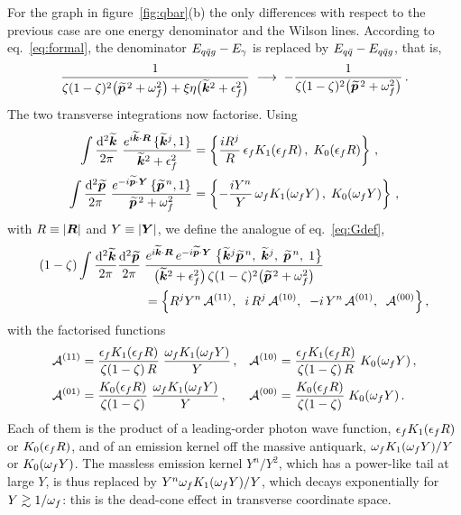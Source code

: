 For the graph in figure~\ref{fig:qbar}(b) the only differences with respect to the previous case are
one energy denominator and the Wilson lines. According to eq.~\eqref{eq:formal}, the denominator
$E_{q\bar q g}-E_\gamma$ is replaced by $E_{q\bar q}-E_{q\bar q g}$, that is,
\begin{equation}
\frac{1}{\zeta(1-\zeta)^2\big(\widetilde{\bm{p}}^{\,2}+\omega_f^2\big)+\xi\eta\big(\widetilde{\bm{k}}^2+\epsilon_f^2\big)}\;\longrightarrow\;
-\frac{1}{\zeta(1-\zeta)^2\big(\widetilde{\bm{p}}^{\,2}+\omega_f^2\big)}\,.
\label{eq:replace}
\end{equation}
The two transverse integrations now factorise. Using
\begin{align}
\int\frac{{\rm d}^2\widetilde{\bm{k}}}{2\pi}\;\frac{e^{i\widetilde{\bm{k}}\cdot\bm{R}}\,\{\widetilde{\bm{k}}^j,1\}}{\widetilde{\bm{k}}^2+\epsilon_f^2}
&=\left\{\frac{iR^j}{R}\,\epsilon_f K_1(\epsilon_f R)\,,\;K_0(\epsilon_f R)\right\}\,,
\nonumber\\
\int\frac{{\rm d}^2\widetilde{\bm{p}}}{2\pi}\;\frac{e^{-i\widetilde{\bm{p}}\cdot\bm{Y}}\,\{\widetilde{\bm{p}}^{\,n},1\}}{\widetilde{\bm{p}}^{\,2}+\omega_f^2}
&=\left\{-\frac{iY^n}{Y}\,\omega_f K_1(\omega_f Y)\,,\;K_0(\omega_f Y)\right\}\,,
\label{eq:FT-fact}
\end{align}
with $R\equiv|\bm{R}|$ and $Y\equiv|\bm{Y}|$, we define the analogue of eq.~\eqref{eq:Gdef},
\begin{align}
(1-\zeta)\int\frac{{\rm d}^2\widetilde{\bm{k}}}{2\pi}\frac{{\rm d}^2\widetilde{\bm{p}}}{2\pi}\;&
\frac{e^{i\widetilde{\bm{k}}\cdot\bm{R}}\,e^{-i\widetilde{\bm{p}}\cdot\bm{Y}}\;\big\{\widetilde{\bm{k}}^j\widetilde{\bm{p}}^{\,n},\;\widetilde{\bm{k}}^j,\;\widetilde{\bm{p}}^{\,n},\;1\big\}}
{\big(\widetilde{\bm{k}}^2+\epsilon_f^2\big)\,\zeta(1-\zeta)^2\big(\widetilde{\bm{p}}^{\,2}+\omega_f^2\big)}
\nonumber\\
&=\Big\{R^jY^n\,\mathcal{A}^{(11)},\;\;i\,R^j\,\mathcal{A}^{(10)},\;\;-i\,Y^n\,\mathcal{A}^{(01)},\;\;\mathcal{A}^{(00)}\Big\}\,,
\label{eq:Adef}
\end{align}
with the factorised functions
\begin{align}
\mathcal{A}^{(11)}&=\frac{\epsilon_f K_1(\epsilon_f R)}{\zeta(1-\zeta)\,R}\;\frac{\omega_f K_1(\omega_f Y)}{Y}\,,
&\mathcal{A}^{(10)}&=\frac{\epsilon_f K_1(\epsilon_f R)}{\zeta(1-\zeta)\,R}\;K_0(\omega_f Y)\,,
\nonumber\\
\mathcal{A}^{(01)}&=\frac{K_0(\epsilon_f R)}{\zeta(1-\zeta)}\;\frac{\omega_f K_1(\omega_f Y)}{Y}\,,
&\mathcal{A}^{(00)}&=\frac{K_0(\epsilon_f R)}{\zeta(1-\zeta)}\;K_0(\omega_f Y)\,.
\label{eq:Aexplicit}
\end{align}
Each of them is the product of a leading-order photon wave function, $\epsilon_f K_1(\epsilon_f R)$ or $K_0(\epsilon_f R)$,
and of an emission kernel off the massive antiquark, $\omega_f K_1(\omega_f Y)/Y$ or $K_0(\omega_f Y)$. The massless
emission kernel $Y^n/Y^2$, which has a power-like tail at large $Y$, is thus replaced by
$Y^n\omega_f K_1(\omega_f Y)/Y$, which decays exponentially for $Y\gtrsim1/\omega_f$: this is the dead-cone
effect in transverse coordinate space.

